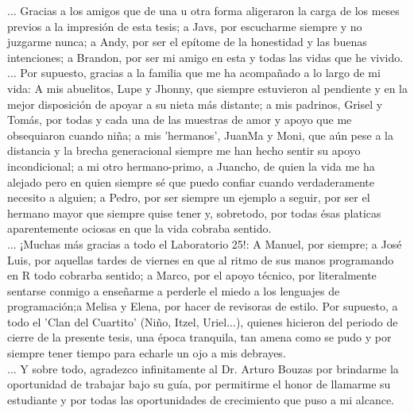 \documentclass[
11pt, %
spanish, %
singlespacing, %
headsepline, %
]{MastersDoctoralThesis} %
\begin{document}
\begin{acknowledgements}
... Gracias a los amigos que de una u otra forma aligeraron la carga de los meses previos a la impresión de esta tesis; a Javs, por escucharme siempre y no juzgarme nunca; a Andy, por ser el epítome de la honestidad y las buenas intenciones; a Brandon, por ser mi amigo en esta y todas las vidas que he vivido.\\

... Por supuesto, gracias a la familia que me ha acompañado a lo largo de mi vida: A mis abuelitos, Lupe y Jhonny, que siempre estuvieron al pendiente y en la mejor disposición de apoyar a su nieta más distante; a mis padrinos, Grisel y Tomás, por todas y cada una de las muestras de amor y apoyo que me obsequiaron cuando niña; a mis 'hermanos', JuanMa y Moni, que aún pese a la distancia y la brecha generacional siempre me han hecho sentir su apoyo incondicional; a mi otro hermano-primo, a Juancho, de quien la vida me ha alejado pero en quien siempre sé que puedo confiar cuando verdaderamente necesito a alguien; a Pedro, por ser siempre un ejemplo a seguir, por ser el hermano mayor que siempre quise tener y, sobretodo, por todas ésas platicas aparentemente ociosas en que la vida cobraba sentido.\\ 

... ¡Muchas más gracias a todo el Laboratorio 25!: A Manuel, por siempre; a José Luis, por aquellas tardes de viernes en que al ritmo de sus manos programando en R todo cobrarba sentido; a Marco, por el apoyo técnico, por literalmente sentarse conmigo a enseñarme a perderle el miedo a los lenguajes de programación;a Melisa y Elena, por  hacer de revisoras de estilo. Por supuesto, a todo el 'Clan del Cuartito' (Niño, Itzel, Uriel...), quienes hicieron del periodo de cierre de la presente tesis, una época tranquila, tan amena como se pudo y por siempre tener tiempo para echarle un ojo a mis debrayes.\\

... Y sobre todo, agradezco infinitamente al Dr. Arturo Bouzas por brindarme la oportunidad de trabajar bajo su guía, por permitirme el honor de llamarme su estudiante y por todas las oportunidades de crecimiento que puso a mi alcance.

\end{acknowledgements}

\end{document}
